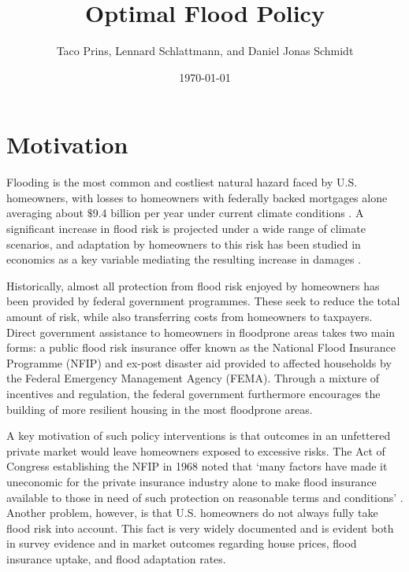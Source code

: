 \documentclass[12pt]{article}
\title{Optimal Flood Policy}
\author{Taco Prins, Lennard Schlattmann, and Daniel Jonas Schmidt}
\date{\today}
\begin{document}
\maketitle


\section{Motivation}
\label{sec:motivation}


Flooding is the most common and costliest natural hazard faced by U.S. homeowners, with losses to homeowners with federally backed mortgages alone averaging about $\$$9.4 billion per year under current climate conditions \citep{cbo2023flooddamage}. A significant increase in flood risk is projected under a wide range of climate scenarios, and adaptation by homeowners to this risk has been studied in economics as a key variable mediating the resulting increase in damages \citep{desmet2018evaluating}. 

Historically, almost all protection from flood risk enjoyed by homeowners has been provided by federal government programmes. These seek to reduce the total amount of risk, while also transferring costs from homeowners to taxpayers. Direct government assistance to homeowners in floodprone areas takes two main forms: a public flood risk insurance offer known as the National Flood Insurance Programme (NFIP) and ex-post disaster aid provided to affected households by the Federal Emergency Management Agency (FEMA). Through a mixture of incentives and regulation, the federal government furthermore encourages the building of more resilient housing in the most floodprone areas.

A key motivation of such policy interventions is that outcomes in an unfettered private market would leave homeowners exposed to excessive risks. The Act of Congress establishing the NFIP in 1968 noted that `many factors have made it uneconomic for the private insurance industry alone to make flood insurance available to those in need of such protection on reasonable terms and conditions' \citep{nfia1968}. Another problem, however, is that U.S. homeowners do not always fully take flood risk into account. This fact is very widely documented and is evident both in survey evidence \citep[e.g.][]{bakkensen2022going,mulder2024mismeasuring} and in market outcomes regarding house prices, flood insurance uptake, and flood adaptation rates. 
\end{document}
